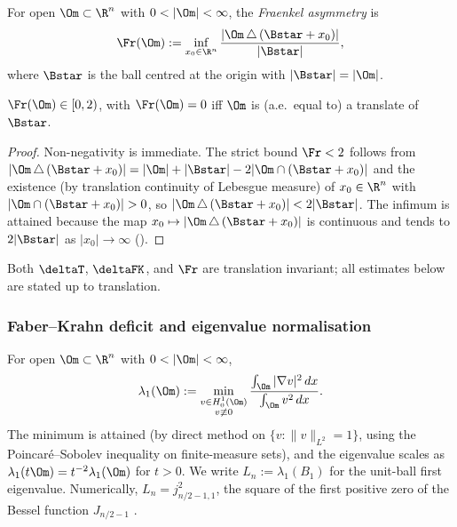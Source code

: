 \begin{definition}\label{def:Fraenkel}
For open $\Om\subset\R^n$ with $0<|\Om|<\infty$, the
\emph{Fraenkel asymmetry} is
\begin{equation}\label{eq:Fraenkel-def}
   \Fr(\Om):=\inf_{x_0\in\R^n}
        \frac{|\Om\,\triangle\,(\Bstar+x_0)|}{|\Bstar|},
\end{equation}
where $\Bstar$ is the ball centred at the origin with $|\Bstar|=|\Om|$.
\end{definition}

\begin{lemma}[Range of $\Fr$]\label{lem:Fraenkel-range}
$\Fr(\Om)\in[0,2)$, with $\Fr(\Om)=0$ iff $\Om$ is (a.e.\ equal to) a
translate of $\Bstar$.
\end{lemma}

\begin{proof}
Non-negativity is immediate. The strict bound $\Fr<2$ follows from
$|\Om\,\triangle\,(\Bstar+x_0)|=|\Om|+|\Bstar|-2|\Om\cap(\Bstar+x_0)|$
and the existence (by translation continuity of Lebesgue measure)
of $x_0\in\R^n$ with $|\Om\cap(\Bstar+x_0)|>0$, so
$|\Om\,\triangle\,(\Bstar+x_0)|<2|\Bstar|$. The infimum is attained
because the map $x_0\mapsto|\Om\,\triangle\,(\Bstar+x_0)|$ is
continuous and tends to $2|\Bstar|$ as $|x_0|\to\infty$
(\cite[Lem.~3.2]{Maggi2008}).
\end{proof}

\begin{remark}\label{rem:trans}
Both $\deltaT$, $\deltaFK$, and $\Fr$ are translation invariant; all
estimates below are stated up to translation.
\end{remark}

\subsubsection{Faber--Krahn deficit and eigenvalue normalisation}
\label{ssec:Faber-Krahn}

\begin{definition}\label{def:lambda1}
For open $\Om\subset\R^n$ with $0<|\Om|<\infty$,
\begin{equation}\label{eq:lambda1-def}
   \lambda_1(\Om):=\min_{\substack{v\in H^{1}_{0}(\Om)\\v\not\equiv 0}}
   \frac{\int_\Om|\nabla v|^2\,dx}{\int_\Om v^2\,dx}.
\end{equation}
The minimum is attained (by direct method on
$\{v:\|v\|_{L^2}=1\}$, using the Poincar\'e--Sobolev inequality on
finite-measure sets), and the eigenvalue scales as
$\lambda_1(t\Om)=t^{-2}\lambda_1(\Om)$ for $t>0$. We write
$L_n:=\lambda_1(B_1)$ for the unit-ball first eigenvalue. Numerically,
$L_n=j_{n/2-1,1}^2$, the square of the first positive zero of the
Bessel function $J_{n/2-1}$ \cite[\S1.3]{HenrotBook}.
\end{definition}

